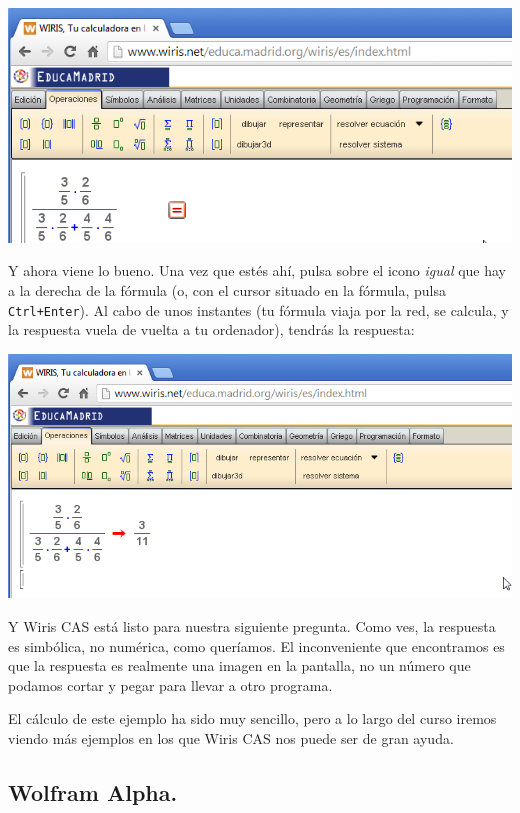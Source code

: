 \documentclass[10pt,a4paper]{article}\usepackage[]{graphicx}\usepackage[]{color}
\newcounter {cont01}
\begin{document}
    \begin{center}
    \includegraphics[width=15.5cm]{../fig/Tut04-13.png}
    \end{center}
Y ahora viene lo bueno. Una vez que estés ahí, pulsa sobre el icono {\em igual} que hay a la derecha de la fórmula (o, con el cursor situado en la fórmula, pulsa {\tt Ctrl+Enter}). Al cabo de unos instantes (tu fórmula viaja por la red, se calcula, y la respuesta vuela de vuelta a tu ordenador), tendrás la respuesta:
    \begin{center}
    \includegraphics[width=15.5cm]{../fig/Tut04-14.png}
    \end{center}
Y Wiris CAS está listo para nuestra siguiente pregunta. Como ves, la respuesta es simbólica, no numérica, como queríamos. El inconveniente que encontramos es que la respuesta es realmente una imagen en la pantalla, no un número que podamos cortar y pegar para llevar a otro programa.

El cálculo de este ejemplo ha sido muy sencillo, pero a lo largo del curso iremos viendo más ejemplos en los que Wiris CAS nos puede ser de gran ayuda.

\subsection{Wolfram Alpha.}
\label{tut03:subsec:WolframAlpha}
\end{document}
